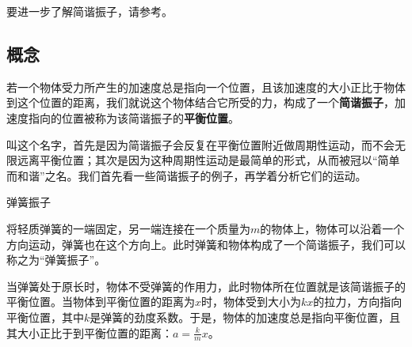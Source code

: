 




要进一步了解简谐振子，请参考。


\subsection{概念}


若一个物体受力所产生的加速度总是指向一个位置，且该加速度的大小正比于物体到这个位置的距离，我们就说这个物体结合它所受的力，构成了一个\textbf{简谐振子}，加速度指向的位置被称为该简谐振子的\textbf{平衡位置}。

叫这个名字，首先是因为简谐振子会反复在平衡位置附近做周期性运动，而不会无限远离平衡位置；其次是因为这种周期性运动是最简单的形式，从而被冠以“简单而和谐”之名。我们首先看一些简谐振子的例子，再学着分析它们的运动。




\begin{example}{弹簧振子}

将轻质弹簧的一端固定，另一端连接在一个质量为$m$的物体上，物体可以沿着一个方向运动，弹簧也在这个方向上。此时弹簧和物体构成了一个简谐振子，我们可以称之为“弹簧振子”。

当弹簧处于原长时，物体不受弹簧的作用力，此时物体所在位置就是该简谐振子的平衡位置。当物体到平衡位置的距离为$x$时，物体受到大小为$kx$的拉力，方向指向平衡位置，其中$k$是弹簧的劲度系数。于是，物体的加速度总是指向平衡位置，且其大小正比于到平衡位置的距离：$a=\frac{k}{m}x$。

\end{example}



